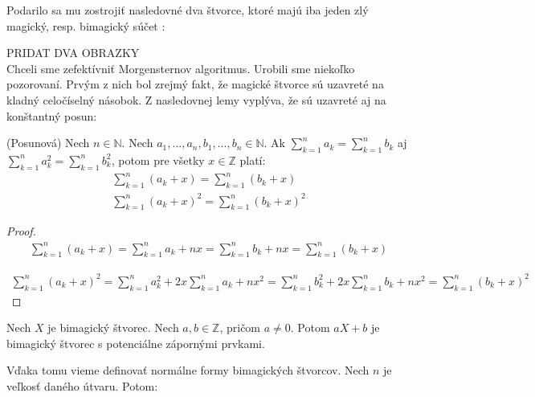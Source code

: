 Podarilo sa mu zostrojiť nasledovné dva štvorce, ktoré majú iba jeden zlý magický, resp. bimagický súčet \cite{multimagie}:

PRIDAT DVA OBRAZKY \\

Chceli sme zefektívniť Morgensternov algoritmus. Urobili sme niekoľko pozorovaní. Prvým z nich bol zrejmý fakt, že magické štvorce sú uzavreté na kladný celočíselný násobok. Z nasledovnej lemy vyplýva, že sú uzavreté aj na konštantný posun:

\begin{lemma} (Posunová) Nech $n \in \mathbb{N}$. Nech $a_1, ... , a_n, b_1, ... , b_n \in \mathbb{N}$. Ak $\sum_{k=1}^{n} a_k = \sum_{k=1}^{n} b_k$ aj $\sum_{k=1}^{n} a^2_k = \sum_{k=1}^{n} b^2_k$, potom pre všetky $x \in \mathbb{Z}$ platí:
\begin{gather}
\sum_{k=1}^{n} (a_k + x) = \sum_{k=1}^{n} (b_k + x) \\
\sum_{k=1}^{n} (a_k + x)^2 = \sum_{k=1}^{n} (b_k + x)^2
\end{gather}
\end{lemma}
 
\begin{proof}
\begin{gather}
\sum_{k=1}^{n} (a_k + x) = \sum_{k=1}^{n} a_k + nx = \sum_{k=1}^{n} b_k + nx = \sum_{k=1}^{n} (b_k + x)
\end{gather}

\begin{gather}
\sum_{k=1}^{n} (a_k + x)^2 = \sum_{k=1}^{n} a^2_k + 2x \sum_{k=1}^{n} a_k + nx^2 = \sum_{k=1}^{n} b^2_k + 2x \sum_{k=1}^{n} b_k + nx^2 = \sum_{k=1}^{n} (b_k + x)^2
\end{gather}
\end{proof}

\begin{consequence} Nech $X$ je bimagický štvorec. Nech $a,b \in \mathbb{Z}$, pričom $a \neq 0$. Potom $aX + b$ je bimagický štvorec s potenciálne zápornými prvkami.
\end{consequence}

Vďaka tomu vieme definovať normálne formy bimagických štvorcov. Nech $n$ je veľkosť daného útvaru. Potom:

